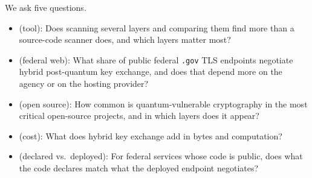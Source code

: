We ask five questions.
\begin{itemize}
\item {} (tool): Does scanning several layers and comparing them find more
  than a source-code scanner does, and which layers matter most?
\item {} (federal web): What share of public federal \texttt{.gov} TLS
  endpoints negotiate hybrid post-quantum key exchange, and does that depend
  more on the agency or on the hosting provider?
\item {} (open source): How common is quantum-vulnerable cryptography in
  the most critical open-source projects, and in which layers does it appear?
\item {} (cost): What does hybrid key exchange add in bytes and
  computation?
\item {} (declared vs.\ deployed): For federal services whose code is
  public, does what the code declares match what the deployed endpoint
  negotiates?
\end{itemize}

